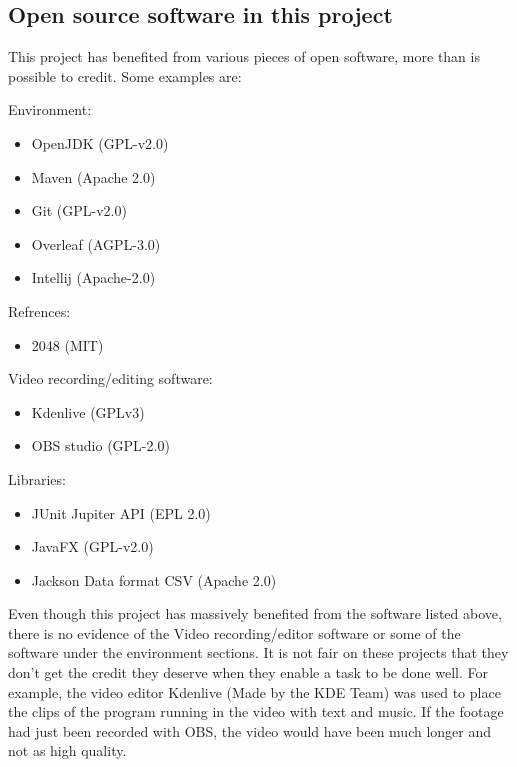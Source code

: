 \documentclass{article}
\begin{document}
\subsection{Open source software in this project}
\label{subsubsec:ossinthis}
This project has benefited from various pieces of open software, more than is possible to credit. Some examples are:
\begin{multicols}{2}
\begin{samepage}
Environment:
\begin{itemize}
    \item OpenJDK (GPL-v2.0)
    \item Maven (Apache 2.0)
    \item Git (GPL-v2.0)
    \item Overleaf (AGPL-3.0)
    \item Intellij (Apache-2.0)
\end{itemize}
\end{samepage}
Refrences:
\begin{itemize}
    \item 2048 (MIT)
\end{itemize}
\columnbreak
\begin{samepage}
Video recording/editing software:
\begin{itemize}
    \item Kdenlive (GPLv3)
    \item OBS studio (GPL-2.0)
\end{itemize}
\end{samepage}
\begin{samepage}
Libraries:
\begin{itemize}
    \item JUnit Jupiter API (EPL 2.0)
    \item JavaFX (GPL-v2.0)
    \item Jackson Data format CSV (Apache 2.0)
\end{itemize}
\end{samepage}
\end{multicols}
Even though this project has massively benefited from the software listed above, there is no evidence of the Video recording/editor software or some of the software under the environment sections. It is not fair on these projects that they don't get the credit they deserve when they enable a task to be done well. For example, the video editor Kdenlive (Made by the KDE Team) was used to place the clips of the program running in the video with text and music. If the footage had just been recorded with OBS, the video would have been much longer and not as high quality.
\end{document}
